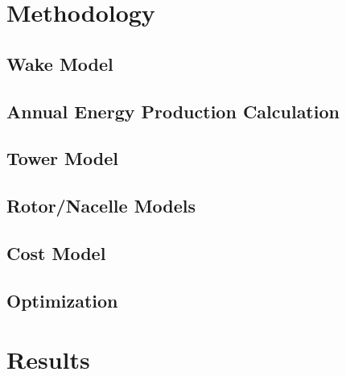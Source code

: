 \documentclass[WESD, manuscript]{copernicus}
\begin{document}
\section{Methodology}

	\subsection{Wake Model}
	
      
	\subsection{Annual Energy Production Calculation}
	

	\subsection{Tower Model}
	

	\subsection{Rotor/Nacelle Models}
	

	\subsection{Cost Model}
	

	\subsection{Optimization}
	\label{sec:optimization}
	




\section{Results}



\conclusions 





\end{document}
